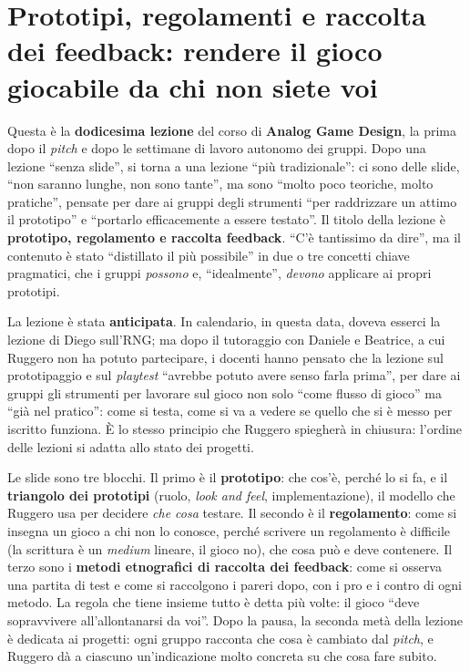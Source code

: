 \chapter[Prototipi, regolamenti e raccolta dei feedback]{Prototipi, regolamenti e
raccolta dei feedback: rendere il gioco giocabile da chi non siete voi}
\label{a12:cap:playtest}

Questa è la \textbf{dodicesima lezione} del corso di \textbf{Analog Game Design}, la
prima dopo il \emph{pitch} e dopo le settimane di lavoro autonomo dei gruppi. Dopo una
lezione ``senza slide'', si torna a una lezione ``più tradizionale'': ci sono delle
slide, ``non saranno lunghe, non sono tante'', ma sono ``molto poco teoriche, molto
pratiche'', pensate per dare ai gruppi degli strumenti ``per raddrizzare un attimo il
prototipo'' e ``portarlo efficacemente a essere testato''. Il titolo della lezione è
\textbf{prototipo, regolamento e raccolta feedback}. ``C'è tantissimo da dire'', ma il
contenuto è stato ``distillato il più possibile'' in due o tre concetti chiave
pragmatici, che i gruppi \emph{possono} e, ``idealmente'', \emph{devono} applicare ai
propri prototipi.

La lezione è stata \textbf{anticipata}. In calendario, in questa data, doveva esserci la
lezione di Diego sull'RNG; ma dopo il tutoraggio con Daniele e Beatrice, a cui Ruggero
non ha potuto partecipare, i docenti hanno pensato che la lezione sul prototipaggio e
sul \emph{playtest} ``avrebbe potuto avere senso farla prima'', per dare ai gruppi gli
strumenti per lavorare sul gioco non solo ``come flusso di gioco'' ma ``già nel
pratico'': come si testa, come si va a vedere se quello che si è messo per iscritto
funziona. È lo stesso principio che Ruggero spiegherà in chiusura: l'ordine delle
lezioni si adatta allo stato dei progetti.

Le slide sono tre blocchi. Il primo è il \textbf{prototipo}: che cos'è, perché lo si
fa, e il \textbf{triangolo dei prototipi} (ruolo, \emph{look and feel},
implementazione), il modello che Ruggero usa per decidere \emph{che cosa} testare. Il
secondo è il \textbf{regolamento}: come si insegna un gioco a chi non lo conosce, perché
scrivere un regolamento è difficile (la scrittura è un \emph{medium} lineare, il gioco
no), che cosa può e deve contenere. Il terzo sono i \textbf{metodi etnografici di
raccolta dei feedback}: come si osserva una partita di test e come si raccolgono i
pareri dopo, con i pro e i contro di ogni metodo. La regola che tiene insieme tutto è
detta più volte: il gioco ``deve sopravvivere all'allontanarsi da voi''. Dopo la pausa,
la seconda metà della lezione è dedicata ai progetti: ogni gruppo racconta che cosa è
cambiato dal \emph{pitch}, e Ruggero dà a ciascuno un'indicazione molto concreta su che
cosa fare subito.

